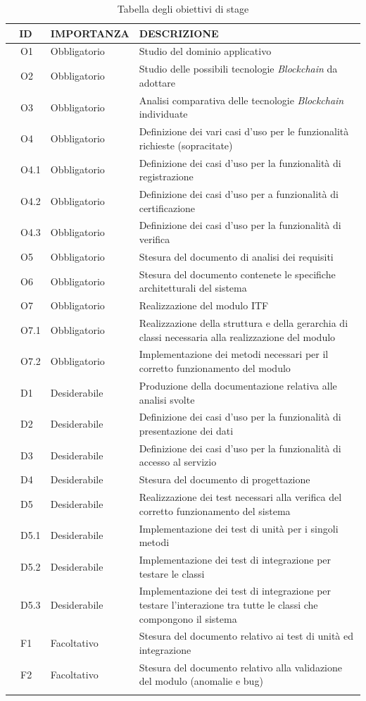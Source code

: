 \begin{longtable}{|r l|p{3cm}|p{10cm}|}
	\hline
	\multicolumn{2}{|c|}{\textbf{ID}} & \textbf{IMPORTANZA} & \textbf{DESCRIZIONE}\tabularnewline
	\hline
	& O1 & Obbligatorio & Studio del dominio applicativo \\\hline
	& O2 & Obbligatorio & Studio delle possibili tecnologie \textit{Blockchain} da adottare \\\hline
	& O3 & Obbligatorio & Analisi comparativa delle tecnologie \textit{Blockchain} individuate \\\hline
	& O4 & Obbligatorio & Definizione dei vari casi d'uso per le funzionalità richieste (sopracitate) \\\hline
	& O4.1 & Obbligatorio & Definizione dei casi d'uso per la funzionalità di registrazione \\\hline
	& O4.2 & Obbligatorio & Definizione dei casi d'uso per a funzionalità di certificazione \\\hline
	& O4.3 & Obbligatorio & Definizione dei casi d'uso per la funzionalità di verifica \\\hline
	& O5 & Obbligatorio & Stesura del documento di analisi dei requisiti\\\hline
	& O6 & Obbligatorio & Stesura del documento contenete le specifiche architetturali del sistema \\\hline
	& O7 & Obbligatorio & Realizzazione del modulo \gls{ITF}\\\hline
	& O7.1 & Obbligatorio & Realizzazione della struttura e della gerarchia di classi necessaria alla realizzazione del modulo \\\hline
	& O7.2 & Obbligatorio & Implementazione dei metodi necessari per il corretto funzionamento del modulo\\\hline
	& D1 & Desiderabile & Produzione della documentazione relativa alle analisi svolte \\\hline
	& D2 & Desiderabile & Definizione dei casi d'uso per la funzionalità di presentazione dei dati \\\hline
	& D3 & Desiderabile & Definizione dei casi d'uso per la funzionalità di accesso al servizio \\\hline
	& D4 & Desiderabile & Stesura del documento di progettazione\\\hline
	& D5 & Desiderabile & Realizzazione dei test necessari alla verifica del corretto funzionamento del sistema\\\hline
	& D5.1 & Desiderabile & Implementazione dei test di unità per i singoli metodi\\\hline
	& D5.2 & Desiderabile & Implementazione dei test di integrazione per testare le classi \\\hline
	& D5.3 & Desiderabile & Implementazione dei test di integrazione per testare l'interazione tra tutte le classi che compongono il sistema \\\hline
	& F1 & Facoltativo & Stesura del documento relativo ai test di unità ed integrazione \\\hline	
	& F2 & Facoltativo & Stesura del documento relativo alla validazione del modulo (anomalie e bug) \\\hline
	\caption{Tabella degli obiettivi di stage}
\end{longtable}
